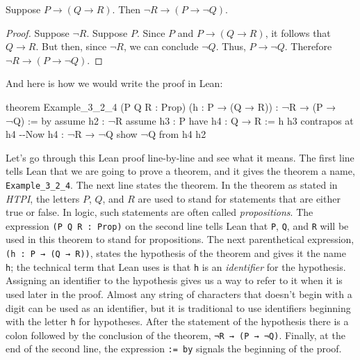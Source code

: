 \documentclass[
  letterpaper,
  DIV=11,
  numbers=noendperiod]{scrreprt}
\newenvironment{Shaded}{\begin{snugshade}}{\end{snugshade}}
\newcommand{\CommentTok}[1]{\textcolor[rgb]{0.37,0.37,0.37}{#1}}
\newcommand{\KeywordTok}[1]{\textcolor[rgb]{0.00,0.23,0.31}{#1}}
\newcommand{\NormalTok}[1]{\textcolor[rgb]{0.00,0.23,0.31}{#1}}
\renewcommand{\NormalTok}[1]{\textcolor[HTML]{000000}{#1}}
\renewcommand{\KeywordTok}[1]{\textcolor[HTML]{0000FF}{#1}}
\renewcommand{\CommentTok}[1]{\textcolor[HTML]{008000}{#1}}
\theoremstyle{remark}
\begin{document}
\begin{thm}
Suppose \(P \to (Q \to R)\). Then \(\neg R \to (P \to \neg Q)\).

\end{thm}

\begin{proof}

Suppose \(\neg R\). Suppose \(P\). Since \(P\) and \(P \to (Q \to R)\),
it follows that \(Q \to R\). But then, since \(\neg R\), we can conclude
\(\neg Q\). Thus, \(P \to \neg Q\). Therefore
\(\neg R \to (P \to \neg Q)\).\qedhere

\end{proof}

And here is how we would write the proof in Lean:

\begin{Shaded}
\begin{Highlighting}[]
\KeywordTok{theorem}\NormalTok{ Example\_3\_2\_4}
\NormalTok{(P Q R : }\KeywordTok{Prop}\NormalTok{) (h : P → (Q → R)) : ¬R → (P → ¬Q) := }\KeywordTok{by}
  \KeywordTok{assume}\NormalTok{ h2 : ¬R}
  \KeywordTok{assume}\NormalTok{ h3 : P}
  \KeywordTok{have}\NormalTok{ h4 : Q → R := h h3}
  \KeywordTok{contrapos} \KeywordTok{at}\NormalTok{ h4            }\CommentTok{{-}{-}Now h4 : ¬R → ¬Q}
  \KeywordTok{show}\NormalTok{ ¬Q }\KeywordTok{from}\NormalTok{ h4 h2}
\end{Highlighting}
\end{Shaded}

Let's go through this Lean proof line-by-line and see what it means. The
first line tells Lean that we are going to prove a theorem, and it gives
the theorem a name, \texttt{Example\_3\_2\_4}. The next line states the
theorem. In the theorem as stated in \emph{HTPI}, the letters \(P\),
\(Q\), and \(R\) are used to stand for statements that are either true
or false. In logic, such statements are often called
\emph{propositions}. The expression \texttt{(P\ Q\ R\ :\ Prop)} on the
second line tells Lean that \texttt{P}, \texttt{Q}, and \texttt{R} will
be used in this theorem to stand for propositions. The next
parenthetical expression, \texttt{(h\ :\ P\ →\ (Q\ →\ R))}, states the
hypothesis of the theorem and gives it the name \texttt{h}; the
technical term that Lean uses is that \texttt{h} is an \emph{identifier}
for the hypothesis. Assigning an identifier to the hypothesis gives us a
way to refer to it when it is used later in the proof. Almost any string
of characters that doesn't begin with a digit can be used as an
identifier, but it is traditional to use identifiers beginning with the
letter \texttt{h} for hypotheses. After the statement of the hypothesis
there is a colon followed by the conclusion of the theorem,
\texttt{¬R\ →\ (P\ →\ ¬Q)}. Finally, at the end of the second line, the
expression \texttt{:=\ by} signals the beginning of the proof.
\end{document}
